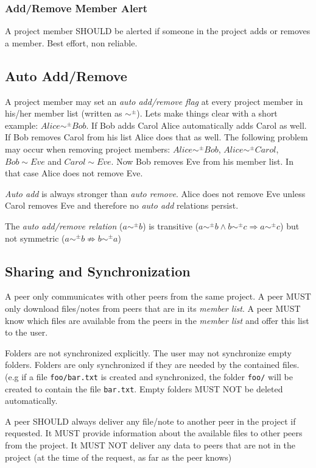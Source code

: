 \subsubsection{Add/Remove Member Alert}
A project member SHOULD be alerted if someone in the project adds or removes a member. Best effort, non reliable.

\subsection{Auto Add/Remove}
A project member may set an \emph{auto add/remove flag} at every project member in his/her member list (written as $\sim ^\pm$). Lets make things clear with a short example: $Alice \sim ^\pm Bob$. If Bob adds Carol Alice automatically adds Carol as well. If Bob removes Carol from his list Alice does that as well. The following problem may occur when removing project members: $Alice \sim ^\pm Bob$, $Alice \sim ^\pm  Carol$, $Bob \sim Eve$ and $Carol \sim Eve$. Now Bob removes Eve from his member list. In that case Alice does not remove Eve.

\emph{Auto add} is always stronger than \emph{auto remove}. Alice does not remove Eve unless Carol removes Eve and therefore no \emph{auto add} relations persist.

The \emph{auto add/remove relation} ($a \sim ^\pm b$) is transitive ($a \sim ^\pm b \wedge b\sim ^\pm c \Rightarrow a \sim ^\pm c$) but not symmetric ($a \sim ^\pm b \not\Rightarrow b \sim ^\pm a$)

\subsection{Sharing and Synchronization}
A peer only communicates with other peers from the same project. A peer MUST only download files/notes from peers that are in its \emph{member list}. A peer MUST know which files are available from the peers in the \emph{member list} and offer this list to the user.

Folders are not synchronized explicitly. The user may not synchronize empty folders. Folders are only synchronized if they are needed by the contained files. (e.g if a file \texttt{foo/bar.txt} is created and synchronized, the folder \texttt{foo/} will be created to contain the file \texttt{bar.txt}. Empty folders MUST NOT be deleted automatically.

A peer SHOULD always deliver any file/note to another peer in the project if requested. It MUST provide information about the available files to other peers from the project. It MUST NOT deliver any data to peers that are not in the project (at the time of the request, as far as the peer knows)

